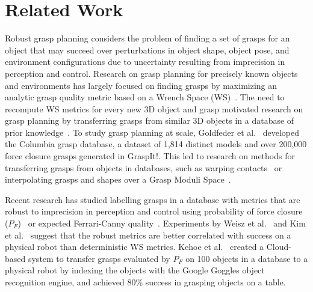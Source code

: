 \section{Related Work}

Robust grasp planning considers the problem of finding a set of grasps for an object that may succeed over perturbations in object shape,  object pose, and environment configurations due to uncertainty resulting from imprecision in perception and control.
Research on grasp planning for precisely known objects and environments has largely focused on finding grasps by maximizing an analytic grasp quality metric based on a Wrench Space (WS)~\cite{pokorny2013c}.
The need to recompute WS metrics for every new 3D object and grasp motivated research on grasp planning by transferring grasps from similar 3D objects in a database of prior knowledge~\cite{bohg2014data}.
To study grasp planning at scale, Goldfeder et al.~\cite{goldfeder2009columbia, goldfeder2011data} developed the Columbia grasp database, a dataset of 1,814 distinct models and over 200,000 force closure grasps generated in GraspIt!.
This led to research on methods for transferring grasps from objects in databases, such as warping contacts~\cite{stouraitis2015functional} or interpolating grasps and shapes over a Grasp Moduli Space~\cite{pokorny2013grasp}.

Recent research has studied labelling grasps in a database with metrics that are robust to imprecision in perception and control using probability of force closure ($P_F$)~\cite{weisz2012pose} or expected Ferrari-Canny quality~\cite{kim2012physically}.
Experiments by Weisz et al.~\cite{weisz2012pose} and Kim et al.~\cite{kim2012physically} suggest that the robust metrics are better correlated with success on a physical robot than deterministic WS metrics.
Kehoe et al.~\cite{kehoe2013cloud} created a Cloud-based system to transfer grasps evaluated by $P_F$ on 100 objects in a database to a physical robot by indexing the objects with the Google Goggles object recognition engine, and achieved 80\% success in grasping objects on a table.

